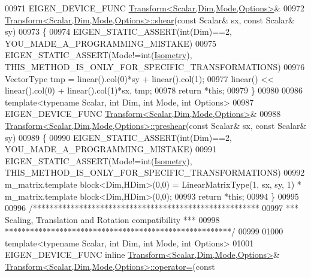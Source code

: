 \begin{DoxyCode}
00971 EIGEN\_DEVICE\_FUNC \hyperlink{group___geometry___module_class_eigen_1_1_transform}{Transform<Scalar,Dim,Mode,Options>}&
00972 \hyperlink{group___geometry___module_a2999a84269a4a08d3af8a3ad1b0598ef}{Transform<Scalar,Dim,Mode,Options>::shear}(\textcolor{keyword}{const} Scalar& sx, \textcolor{keyword}{const} 
      Scalar& sy)
00973 \{
00974   EIGEN\_STATIC\_ASSERT(\textcolor{keywordtype}{int}(Dim)==2, YOU\_MADE\_A\_PROGRAMMING\_MISTAKE)
00975   EIGEN\_STATIC\_ASSERT(Mode!=\textcolor{keywordtype}{int}(\hyperlink{group__enums_ggaee59a86102f150923b0cac6d4ff05107a080cd5366173608f701cd945c2335568}{Isometry}), THIS\_METHOD\_IS\_ONLY\_FOR\_SPECIFIC\_TRANSFORMATIONS)
00976   VectorType tmp = linear().col(0)*sy + linear().col(1);
00977   linear() << linear().col(0) + linear().col(1)*sx, tmp;
00978   \textcolor{keywordflow}{return} *\textcolor{keyword}{this};
00979 \}
00980 
00986 \textcolor{keyword}{template}<\textcolor{keyword}{typename} Scalar, \textcolor{keywordtype}{int} Dim, \textcolor{keywordtype}{int} Mode, \textcolor{keywordtype}{int} Options>
00987 EIGEN\_DEVICE\_FUNC \hyperlink{group___geometry___module_class_eigen_1_1_transform}{Transform<Scalar,Dim,Mode,Options>}&
00988 \hyperlink{group___geometry___module_a2540957bb590f16260689bcf32d28a7a}{Transform<Scalar,Dim,Mode,Options>::preshear}(\textcolor{keyword}{const} Scalar& sx, \textcolor{keyword}{
      const} Scalar& sy)
00989 \{
00990   EIGEN\_STATIC\_ASSERT(\textcolor{keywordtype}{int}(Dim)==2, YOU\_MADE\_A\_PROGRAMMING\_MISTAKE)
00991   EIGEN\_STATIC\_ASSERT(Mode!=\textcolor{keywordtype}{int}(\hyperlink{group__enums_ggaee59a86102f150923b0cac6d4ff05107a080cd5366173608f701cd945c2335568}{Isometry}), THIS\_METHOD\_IS\_ONLY\_FOR\_SPECIFIC\_TRANSFORMATIONS)
00992   m\_matrix.template block<Dim,HDim>(0,0) = LinearMatrixType(1, sx, sy, 1) * m\_matrix.template 
      block<Dim,HDim>(0,0);
00993   \textcolor{keywordflow}{return} *\textcolor{keyword}{this};
00994 \}
00995 
00996 \textcolor{comment}{/******************************************************}
00997 \textcolor{comment}{*** Scaling, Translation and Rotation compatibility ***}
00998 \textcolor{comment}{******************************************************/}
00999 
01000 \textcolor{keyword}{template}<\textcolor{keyword}{typename} Scalar, \textcolor{keywordtype}{int} Dim, \textcolor{keywordtype}{int} Mode, \textcolor{keywordtype}{int} Options>
01001 EIGEN\_DEVICE\_FUNC \textcolor{keyword}{inline} \hyperlink{group___geometry___module_class_eigen_1_1_transform}{Transform<Scalar,Dim,Mode,Options>}& 
      \hyperlink{group___geometry___module_class_eigen_1_1_transform}{Transform<Scalar,Dim,Mode,Options>::operator=}(\textcolor{keyword}{const} 

\end{DoxyCode}
